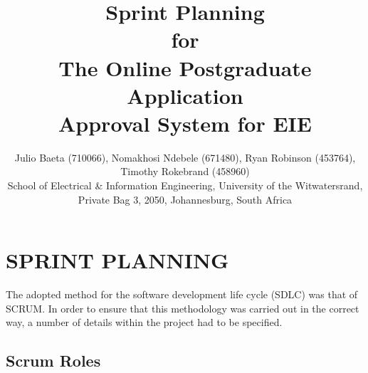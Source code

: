 \documentclass[journal,comsoc,onecolumn]{IEEEtran}
\begin{document}

\title{Sprint Planning \\ \vspace{7mm} for \\ \vspace{7mm} The Online Postgraduate Application \\ Approval System for EIE}

\author{\vspace{3mm} Julio Baeta (710066), Nomakhosi Ndebele (671480), Ryan Robinson (453764), Timothy Rokebrand (458960)\\ \small \vspace{2mm} School of Electrical \& Information Engineering, University of the Witwatersrand, Private Bag 3, 2050, Johannesburg, South Africa}

\markboth{}{}

\maketitle

\thispagestyle{empty}


\newpage

\thispagestyle{empty}

\section{SPRINT PLANNING}


The adopted method for the software development life cycle (SDLC) was that of SCRUM. In order to ensure that this methodology was carried out in the correct way, a number of details within the project had to be specified.


\subsection{Scrum Roles}
\end{document}
